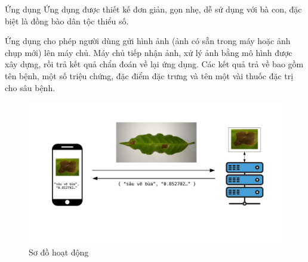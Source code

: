 \documentclass{beamer}
\begin{document}
\begin{frame}[allowframebreaks]{Ứng dụng}
	Ứng dụng được thiết kế đơn giản, gọn nhẹ, dễ sử dụng với bà con, đặc biệt là đồng bào dân tộc thiểu số.

	\null

	Ứng dụng cho phép người dùng gửi hình ảnh (ảnh có sẵn trong máy hoặc ảnh chụp mới) lên máy chủ. Máy chủ tiếp nhận ảnh, xử lý ảnh bằng mô hình được xây dựng, rồi trả kết quả chẩn đoán về lại ứng dụng. Các kết quả trả về bao gồm tên bệnh, một số triệu chứng, đặc điểm đặc trưng và tên một vài thuốc đặc trị cho sâu bệnh.

	\framebreak

	\begin{figure}[H]
		\includegraphics[scale=0.35]{images/chart.pdf}
		\caption{Sơ đồ hoạt động}
	\end{figure}

\end{frame}
\end{document}
